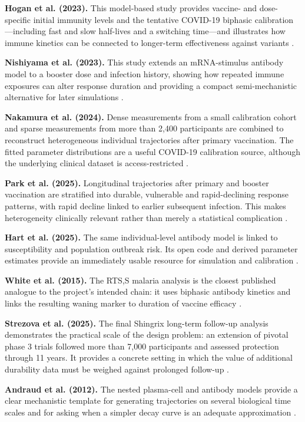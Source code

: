 \documentclass[11pt,a4paper]{article}
\begin{document}
\textbf{Hogan et al. (2023).} This model-based study provides vaccine- and dose-specific initial
immunity levels and the tentative COVID-19 biphasic calibration---including fast and slow
half-lives and a switching time---and illustrates how immune kinetics can be connected to
longer-term effectiveness against variants \parencite{hogan2023}.

\textbf{Nishiyama et al. (2023).} This study extends an mRNA-stimulus antibody model to a booster
dose and infection history, showing how repeated immune exposures can alter response duration and
providing a compact semi-mechanistic alternative for later simulations \parencite{nishiyama2023}.

\textbf{Nakamura et al. (2024).} Dense measurements from a small calibration cohort and sparse
measurements from more than 2,400 participants are combined to reconstruct heterogeneous
individual trajectories after primary vaccination. The fitted parameter distributions are a useful
COVID-19 calibration source, although the underlying clinical dataset is access-restricted
\parencite{nakamura2024}.

\textbf{Park et al. (2025).} Longitudinal trajectories after primary and booster vaccination are
stratified into durable, vulnerable and rapid-declining response patterns, with rapid decline linked
to earlier subsequent infection. This makes heterogeneity clinically relevant rather than merely a
statistical complication \parencite{park2025}.

\textbf{Hart et al. (2025).} The same individual-level antibody model is linked to susceptibility
and population outbreak risk. Its open code and derived parameter estimates provide an immediately
usable resource for simulation and calibration \parencite{hart2025}.

\textbf{White et al. (2015).} The RTS,S malaria analysis is the closest published analogue to the
project's intended chain: it uses biphasic antibody kinetics and links the resulting waning marker
to duration of vaccine efficacy \parencite{white2015}.

\textbf{Strezova et al. (2025).} The final Shingrix long-term follow-up analysis demonstrates the
practical scale of the design problem: an extension of pivotal phase 3 trials followed more than
7,000 participants and assessed protection through 11 years. It provides a concrete setting in
which the value of additional durability data must be weighed against prolonged follow-up
\parencite{strezova2025}.

\textbf{Andraud et al. (2012).} The nested plasma-cell and antibody models provide a clear
mechanistic template for generating trajectories on several biological time scales and for asking
when a simpler decay curve is an adequate approximation \parencite{andraud2012}.
\end{document}
